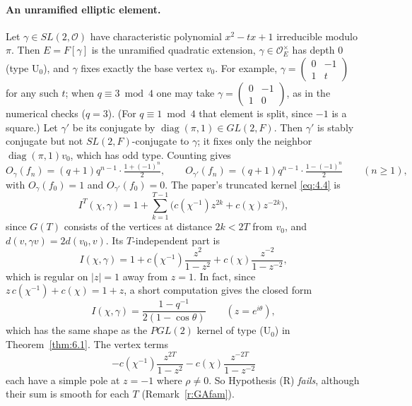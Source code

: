 \documentclass[12pt,letterpaper]{article}
\numberwithin{equation}{section}
\theoremstyle{plain}
\theoremstyle{remark}
\theoremstyle{plain}
\theoremstyle{definition}
\theoremstyle{remark}
\theoremstyle{remark}
\newcommand{\OO}{\mathcal{O}}
\DeclareMathOperator{\diag}{diag}
\begin{document}
\paragraph{An unramified elliptic element.} Let $\gamma\in SL(2,\OO)$ have characteristic polynomial $x^2-tx+1$ irreducible modulo $\pi$. Then $E=F[\gamma]$ is the unramified quadratic extension, $\gamma\in\OO_E^\times$ has depth $0$ (type U$_0$), and $\gamma$ fixes exactly the base vertex $v_0$. For example, $\gamma=\left(\begin{smallmatrix}0&-1\\1&t\end{smallmatrix}\right)$ for any such $t$; when $q\equiv3\bmod 4$ one may take $\gamma=\left(\begin{smallmatrix}0&-1\\1&0\end{smallmatrix}\right)$, as in the numerical checks ($q=3$). (For $q\equiv1\bmod4$ that element is split, since $-1$ is a square.) Let $\gamma'$ be its conjugate by $\diag(\pi,1)\in GL(2,F)$. Then $\gamma'$ is stably conjugate but not $SL(2,F)$-conjugate to $\gamma$; it fixes only the neighbor $\diag(\pi,1)v_0$, which has odd type. Counting gives
\[
O_\gamma(f_n)=(q+1)q^{n-1}\cdot\tfrac{1+(-1)^n}{2},\qquad O_{\gamma'}(f_n)=(q+1)q^{n-1}\cdot\tfrac{1-(-1)^n}{2}\qquad(n\ge1),
\]
with $O_\gamma(f_0)=1$ and $O_{\gamma'}(f_0)=0$. The paper's truncated kernel \eqref{eq:4.4} is
\[
I^T(\chi,\gamma)=1+\sum_{k=1}^{T-1}\big(c(\chi^{-1})z^{2k}+c(\chi)z^{-2k}\big),
\]
since $G(T)$ consists of the vertices at distance $2k<2T$ from $v_0$, and $d(v,\gamma v)=2d(v_0,v)$. Its $T$-independent part is
\begin{equation}\label{eq:6.6}
I(\chi,\gamma)=1+c(\chi^{-1})\frac{z^2}{1-z^2}+c(\chi)\frac{z^{-2}}{1-z^{-2}},
\end{equation}
which is regular on $|z|=1$ away from $z=1$. In fact, since $z\,c(\chi^{-1})+c(\chi)=1+z$, a short computation gives the closed form
\[
I(\chi,\gamma)=\frac{1-q^{-1}}{2(1-\cos\theta)}\qquad(z=e^{i\theta}),
\]
which has the same shape as the $PGL(2)$ kernel of type (U$_0$) in Theorem~\ref{thm:6.1}. The vertex terms
\[
-c(\chi^{-1})\frac{z^{2T}}{1-z^2}-c(\chi)\frac{z^{-2T}}{1-z^{-2}}
\]
each have a simple pole at $z=-1$ where $\rho\ne0$. So Hypothesis (R) \emph{fails}, although their sum is smooth for each $T$ (Remark~\ref{r:GAfam}).
\end{document}
